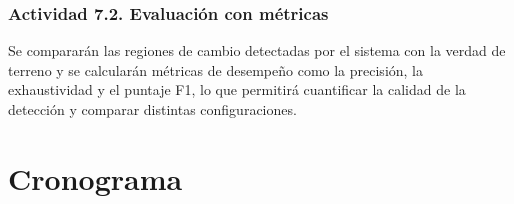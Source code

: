 \documentclass[12pt,onecolumn]{IEEEtran}
\begin{document}
\subsubsection{{Actividad 7.2. Evaluación con métricas}}

Se compararán las regiones de cambio detectadas por el sistema con la verdad de terreno y se calcularán métricas de desempeño como la precisión, la exhaustividad y el puntaje F1, lo que permitirá cuantificar la calidad de la detección y comparar distintas configuraciones.
\newpage
\section{\textbf{Cronograma}}
\end{document}

